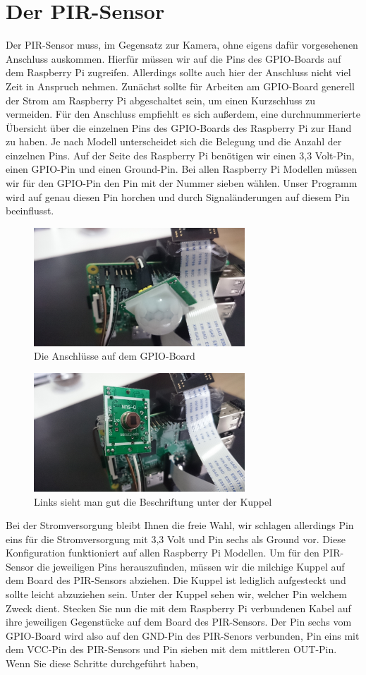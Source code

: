 \documentclass[12pt,a4paper]{scrreprt}
\begin{document}
\section{Der PIR-Sensor}
Der PIR-Sensor muss, im Gegensatz zur Kamera, ohne eigens dafür vorgesehenen Anschluss auskommen. Hierfür müssen wir auf die Pins des GPIO-Boards auf dem Raspberry Pi zugreifen. Allerdings sollte auch hier der Anschluss nicht viel Zeit in Anspruch nehmen. Zunächst sollte für Arbeiten am GPIO-Board generell der Strom am Raspberry Pi abgeschaltet sein, um einen Kurzschluss zu vermeiden. Für den Anschluss empfiehlt es sich außerdem, eine durchnummerierte Übersicht über die einzelnen Pins des GPIO-Boards des Raspberry Pi zur Hand zu haben. Je nach Modell unterscheidet sich die Belegung und die Anzahl der einzelnen Pins. Auf der Seite des Raspberry Pi benötigen wir einen 3,3 Volt-Pin, einen GPIO-Pin und einen Ground-Pin. Bei allen Raspberry Pi Modellen müssen wir für den GPIO-Pin den Pin mit der Nummer sieben wählen. Unser Programm wird auf genau diesen Pin horchen und durch Signaländerungen auf diesem Pin beeinflusst. \begin{figure}[h] \centering \includegraphics[width = 7.9cm]{pir1.JPG} \caption{Die Anschlüsse auf dem GPIO-Board} \end{figure} \begin{figure}[h] \centering \includegraphics[width = 7.9cm]{pir2.JPG} \caption{Links sieht man gut die Beschriftung unter der Kuppel} \end{figure}Bei der Stromversorgung bleibt Ihnen die freie Wahl, wir schlagen allerdings Pin eins für die Stromversorgung mit 3,3 Volt und Pin sechs als Ground vor. Diese Konfiguration funktioniert auf allen Raspberry Pi Modellen. Um für den PIR-Sensor die jeweiligen Pins herauszufinden, müssen wir die milchige Kuppel auf dem Board des PIR-Sensors abziehen. Die Kuppel ist lediglich aufgesteckt und sollte leicht abzuziehen sein. Unter der Kuppel sehen wir, welcher Pin welchem Zweck dient. Stecken Sie nun die mit dem Raspberry Pi verbundenen Kabel auf ihre jeweiligen Gegenstücke auf dem Board des PIR-Sensors. Der Pin sechs vom GPIO-Board wird also auf den GND-Pin des PIR-Senors verbunden, Pin eins mit dem VCC-Pin des PIR-Sensors und Pin sieben mit dem mittleren OUT-Pin. Wenn Sie diese Schritte durchgeführt haben, 
\end{document}
